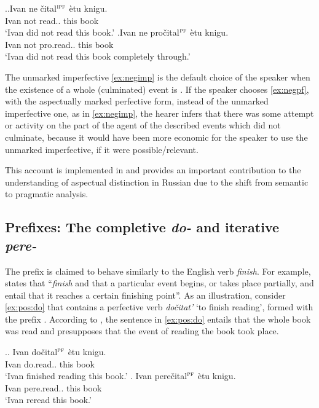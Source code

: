 \ex.\ag.\label{ex:negimp}Ivan ne \v{c}ital$^{\textsc{ipf}}$ \`{e}tu knigu.\\
Ivan not read.. this book\\
\trans `Ivan did not read this book.'
\bg.\label{ex:negpf}Ivan ne pro\v{c}ital$^{\textsc{pf}}$ \`{e}tu knigu.\\
Ivan not pro.read.. this book\\
\trans `Ivan did not read this book completely through.'\\

The unmarked imperfective \ref{ex:negimp} is the default choice of the speaker when the existence of a whole (culminated) event is .
If the speaker chooses \ref{ex:negpf}, with the aspectually marked perfective form, instead of the unmarked imperfective one, as in \ref{ex:negimp}, the hearer infers that there was some attempt or activity on the part of the agent of the described events which did not culminate, because it would have been more economic for the speaker to use the unmarked imperfective, if it were possible/relevant.

This account is implemented in  \citep{Blutner:00} and provides an important contribution to the understanding of aspectual distinction in Russian due to the shift from semantic  to pragmatic analysis.

\subsection{Prefixes: The completive \textit{do-} and iterative \textit{pere-}}\label{sec:pragm:old:pref}
The  prefix  is claimed to behave similarly to the English verb \textit{finish}. For example, \citet[75]{Kagan:book} states that ``\textit{finish} and   that a particular event begins, or takes place partially, and entail that it reaches a certain finishing point''. As an illustration, consider \ref{ex:pos:do} that contains a perfective verb \textit{do\v{c}itat'} `to finish reading', formed with the  prefix . According to \citet{Kagan:book}, the sentence in \ref{ex:pos:do} entails that the whole book was read and presupposes that the event of reading the book took place.

\ex.\ag. \label{ex:pos:do}Ivan do\v{c}ital$^{\textsc{pf}}$ \`{e}tu knigu.\\
Ivan do.read.. this book\\
\trans `Ivan finished reading this book.'
\bg. \label{ex:pos:pere}Ivan pere\v{c}ital$^{\textsc{pf}}$ \`{e}tu knigu.\\
Ivan pere.read.. this book\\
\trans `Ivan reread this book.'

